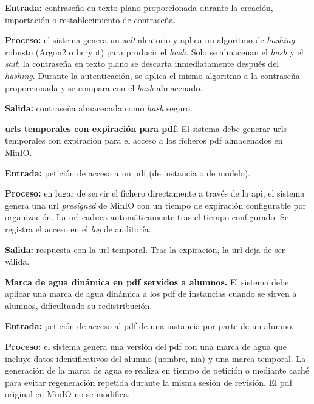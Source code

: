 \begin{functional}
    \textbf{Entrada:} contraseña en texto plano proporcionada durante la creación,
    importación o restablecimiento de contraseña.

    \textbf{Proceso:} el sistema genera un \textit{salt} aleatorio y aplica un algoritmo de
    \textit{hashing} robusto (Argon2 o bcrypt) para producir el \textit{hash}. Solo se
    almacenan el \textit{hash} y el \textit{salt}; la contraseña en texto plano se descarta
    inmediatamente después del \textit{hashing}. Durante la autenticación, se aplica el
    mismo algoritmo a la contraseña proporcionada y se compara con el \textit{hash}
    almacenado.

    \textbf{Salida:} contraseña almacenada como \textit{hash} seguro.

    \item \textbf{\acsp{url} temporales con expiración para \acs{pdf}.}
    \label{rf:sec:presigned}
    El sistema debe generar \acsp{url} temporales con expiración para el acceso a los
    ficheros \acs{pdf} almacenados en MinIO.

    \textbf{Entrada:} petición de acceso a un \acs{pdf} (de instancia o de modelo).

    \textbf{Proceso:} en lugar de servir el fichero directamente a través de la \acs{api},
    el sistema genera una \acs{url} \textit{presigned} de MinIO con un tiempo de expiración
    configurable por organización. La \acs{url} caduca automáticamente tras el tiempo
    configurado. Se registra el acceso en el \textit{log} de auditoría.

    \textbf{Salida:} respuesta con la \acs{url} temporal. Tras la expiración, la \acs{url}
    deja de ser válida.

    \item \textbf{Marca de agua dinámica en \acs{pdf} servidos a alumnos.}
    \label{rf:sec:watermark}
    El sistema debe aplicar una marca de agua dinámica a los \acs{pdf} de instancias cuando
    se sirven a alumnos, dificultando su redistribución.

    \textbf{Entrada:} petición de acceso al \acs{pdf} de una instancia por parte de un
    alumno.

    \textbf{Proceso:} el sistema genera una versión del \acs{pdf} con una marca de agua que
    incluye datos identificativos del alumno (nombre, \acs{nia}) y una marca temporal. La
    generación de la marca de agua se realiza en tiempo de petición o mediante caché para
    evitar regeneración repetida durante la misma sesión de revisión. El \acs{pdf} original
    en MinIO no se modifica.


\end{functional}
